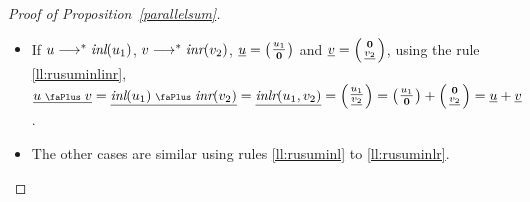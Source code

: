 \documentclass[screen, sigconf,authorversion,nonacm]{acmart}
\theoremstyle{acmdefinition}
\numberwithin{equation}{section}
\newcommand\inl{\mbox{\it inl}}
\newcommand\inr{\mbox{\it inr}}
\newcommand\inlr{\mbox{\it inlr}}
\newcommand\plus{\mathrel{\text{\normalfont\scalebox{0.7}{\faPlus}}}}
\newcommand\lra{\longrightarrow}
\begin{document}
\begin{proof}[Proof of Proposition~\ref{parallelsum}]
\begin{itemize}
\begin{itemize}
	\item
	  If  $u \lra^* \inl(u_1)$, $v \lra^* \inr(v_2)$,
	  $\underline{u} = \left(\begin{smallmatrix}
	      \underline{u_1} \\ {\bf 0}
	  \end{smallmatrix}\right)$ and 
	  $\underline{v} = \left(\begin{smallmatrix} {\bf 0} \\ \underline{v_2} 
	  \end{smallmatrix}\right)$, using 
	  the rule \eqref{ll:rusuminlinr},
	  $\underline{u \plus v}
	  = \underline{\inl(u_1) \plus \inr(v_2)}
	  = \underline{\inlr(u_1, v_2)}
	  = \left(\begin{smallmatrix} \underline{u_1} \\
	      \underline{v_2}
	  \end{smallmatrix}\right)
	  = \left(\begin{smallmatrix} \underline{u_1} \\
	      {\bf 0}
	  \end{smallmatrix}\right)
	  +
	  \left(\begin{smallmatrix} {\bf 0} \\
	      \underline{v_2}
	  \end{smallmatrix}\right)
	  =  \underline{u} + \underline{v}$.

	\item The other cases are similar using
	  rules \eqref{ll:rusuminl} to \eqref{ll:rusuminlr}.
	  \qedhere
      \end{itemize}
  \end{itemize}
\end{proof}
\end{document}
